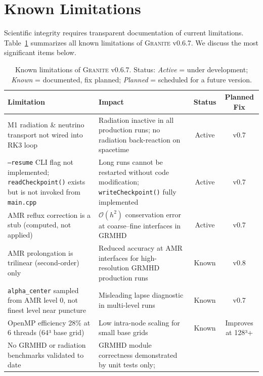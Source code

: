 \documentclass[aps,prd,twocolumn,superscriptaddress,nofootinbib,showpacs,
               longbibliography]{revtex4-2}
\newcommand{\granite}{\textsc{Granite}}
\newcommand{\code}[1]{\texttt{#1}}
\newcommand{\order}[1]{\mathcal{O}(#1)}
\begin{document}
\section{Known Limitations}
\label{sec:limitations}

Scientific integrity requires transparent documentation of current limitations.
Table~\ref{tab:limitations} summarizes all known limitations of \granite{}
v0.6.7.
We discuss the most significant items below.

\begin{table}[t]
\caption{Known limitations of \granite{} v0.6.7. Status: \textit{Active} =
  under development; \textit{Known} = documented, fix planned;
  \textit{Planned} = scheduled for a future version.}
\label{tab:limitations}
\begin{ruledtabular}
\begin{tabular}{p{6cm}p{4.5cm}cc}
  Limitation & Impact & Status & Planned Fix \\ \hline
  M1 radiation \& neutrino transport not wired into RK3 loop
    & Radiation inactive in all production runs; no radiation back-reaction on spacetime
    & Active & v0.7 \\[2pt]
  \code{--resume} CLI flag not implemented;
    \code{readCheckpoint()} exists but is not invoked from \code{main.cpp}
    & Long runs cannot be restarted without code modification;
      \code{writeCheckpoint()} fully implemented
    & Active & v0.7 \\[2pt]
  AMR reflux correction is a stub (computed, not applied)
    & $\order{h^2}$ conservation error at coarse--fine interfaces in GRMHD
    & Active & v0.7 \\[2pt]
  AMR prolongation is trilinear (second-order) only
    & Reduced accuracy at AMR interfaces for high-resolution GRMHD production runs
    & Known & v0.8 \\[2pt]
  \code{alpha\_center} sampled from AMR level 0, not finest level near puncture
    & Misleading lapse diagnostic in multi-level runs
    & Known & v0.7 \\[2pt]
  OpenMP efficiency 28\% at 6 threads (64³ base grid)
    & Low intra-node scaling for small base grids
    & Known & Improves at 128³+ \\[2pt]
  No GRMHD or radiation benchmarks validated to date
    & GRMHD module correctness demonstrated by unit tests only;

\end{tabular}
\end{ruledtabular}
\end{table}
\end{document}

